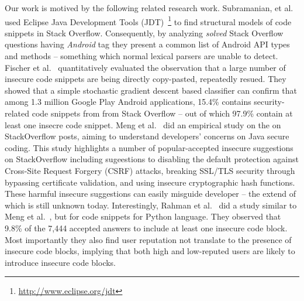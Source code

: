 
Our work is motived by the following related research work. 
Subramanian, et al.~\cite{subramanian2013making} used Eclipse Java Development Tools (JDT)~\footnote{\url{http://www.eclipse.org/jdt}}  
to find structural models of code snippets in Stack Overflow. Consequently, by analyzing \textit{solved} Stack Overflow questions having \textit{Android} tag they present a common list of Android API types and methods -- something which normal lexical parsers are unable to detect. 
Fischer et al.~\cite{fischer2017stack}  quantitatively evaluated the observation that a large number of insecure code snippets are being directly copy-pasted, repeatedly resued. They showed that a simple stochastic gradient descent based classifier can confirm that among 1.3 million Google Play Android applications, 15.4\% contains security-related code snippets from  from Stack Overflow -- out of which 97.9\% contain at least one insecre code snippet. 
Meng et al.~\cite{meng2018secure} did an empirical study on the on StackOverflow posts, aiming to understand developers’ concerns on Java secure coding. This study highlights a number of popular-accepted insecure suggestions on  StackOverflow including sugeestions to disabling the default protection against Cross-Site Request Forgery (CSRF) attacks, breaking SSL/TLS security through bypassing certificate validation, and using insecure cryptographic hash functions. These harmful insecure suggestions can easily misguide developer -- the extend of which is still unknown today. 
Interestingly, Rahman et al.~\cite{akondsnakes} did a study similar to Meng et al.~\cite{meng2018secure}, but for code snippets for Python language. They observed that 9.8\% of the 7,444 accepted answers to include at least one insecure code block. Most importantly they also find user reputation not
translate to the presence of insecure code blocks, implying  that both high and low-reputed users are likely to introduce insecure code blocks. 


